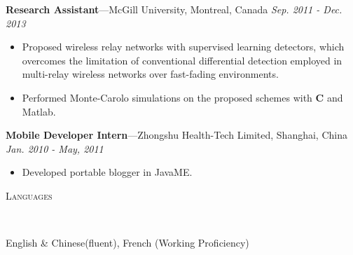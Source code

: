 \documentclass[11pt]{article}
\newenvironment{changemargin}[2]{%
  \begin{list}{}{%
    \setlength{\topsep}{0pt}%
    \setlength{\leftmargin}{#1}%
    \setlength{\rightmargin}{#2}%
    \setlength{\listparindent}{\parindent}%
    \setlength{\itemindent}{\parindent}%
    \setlength{\parsep}{\parskip}%
  }%
  \item[]}{\end{list}
}
\newcommand{\lineover}{
	\begin{changemargin}{-0.05in}{-0.05in}
		\vspace*{-8pt}
		\hrulefill \\
		\vspace*{-2pt}
	\end{changemargin}
}
\newcommand{\header}[1]{
	\begin{changemargin}{-0.5in}{-0.5in}
		\scshape{#1}\\
  	\lineover
	\end{changemargin}
}
\newenvironment{body} {
	\vspace*{-16pt}
	\begin{changemargin}{-0.25in}{-0.5in}
  }	
	{\end{changemargin}
}
\begin{document}
\begin{body}
	\textbf{Research Assistant}---McGill University, Montreal, Canada  \hfill \emph{Sep. 2011 - Dec. 2013}\\
	\vspace*{-4pt}
	\begin{itemize} \itemsep -0pt  %
\item Proposed wireless relay networks with supervised learning detectors, which overcomes the limitation of conventional differential detection employed in multi-relay wireless networks over fast-fading environments. 
\item Performed Monte-Carolo simulations on the proposed schemes with \textbf{C} and Matlab.
	\end{itemize}

	\textbf{Mobile Developer Intern}---Zhongshu Health-Tech Limited, Shanghai, China \hfill \emph{Jan. 2010 - May, 2011}\\
	\begin{itemize} \itemsep -0pt  %
		\item Developed portable blogger in JavaME.
	\end{itemize}
\end{body}
\smallskip

\header{Languages}
\begin{body}
	\vspace{14pt}
	English \& Chinese(fluent), French (Working Proficiency)\\
\end{body}
\smallskip
\end{document}
